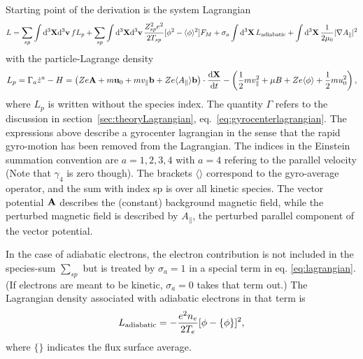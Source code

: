 Starting point of the derivation is the system Lagrangian  
\begin{equation}
L = \sum_{sp} \int {\rm d}^3{\bf X} {\rm d}^3 {\bf v} \, f L_p + \sum_{sp} \int {\rm d}^3 {\bf X} 
{\rm d}^3 {\bf v} \, \frac{Z_{sp}^2 e^2}{2 T_{sp} } [ \phi^2 - \langle \phi \rangle^2 ] F_M + \sigma_a \int {\rm d}^3 {\bf X} \,  L_{\rm adiabatic} 
+ \int {\rm d}^3 {\bf X} \, \frac{1 }{ 2 \mu_0} \vert \nabla A_\parallel \vert^2 
  \label{eq:lagrangian}
\end{equation}
with the particle-Lagrange density 
\begin{equation}
L_p = \Gamma_a \dot z^a -H  = \left ( Z e {\bf A} + m {\bf u}_0 +  m v_\parallel {\bf b} + Z e \langle A_\parallel \rangle  {\bf b} \right ) \cdot \frac{\mathrm{d} \bf X}{\mathrm{d} t} 
- \left ( \frac{1 }{ 2} m v_\parallel^2 + \mu B + Z e \langle \phi \rangle + \frac{1 }{ 2} m u_0^2 \right ) ,
\label{eq:plagrangian}
\end{equation}
where $L_p$ is written without the species index. The quantity $\Gamma$ refers to the discussion in section~\ref{sec:theoryLagrangian}, eq.~\eqref{eq:gyrocenterlagrangian}.
The expressions above describe a gyrocenter lagrangian in the sense that the rapid gyro-motion has been removed from the Lagrangian. The indices in the Einstein 
summation convention are $a = 1,2,3,4$ with $a = 4$ refering to the parallel velocity (Note that $\gamma_4$ is zero though). 
The brackets $\langle \rangle$ correspond to the gyro-average operator, and the sum with index sp is over all 
kinetic species. 
The vector potential ${\bf A}$ describes the (constant) background magnetic field, while the perturbed magnetic field is 
described by $A_\parallel$, the perturbed parallel component of the vector potential. 

In the case of adiabatic electrons, the electron contribution is not included in the species-sum $\sum_{sp}$ but is treated by $\sigma_a = 1$ in a special term in eq. \eqref{eq:lagrangian}.
(If electrons are meant to be kinetic, $\sigma_a = 0$ takes that term out.)
The Lagrangian density associated with adiabatic electrons in that term is 
\begin{equation}
L_{\rm adiabatic} = - \frac{e^2 n_e }{ 2 T_e} [ \phi - \{ \phi \} ]^2 ,  
\end{equation}
where $\{ \}$ indicates the flux surface average. 


